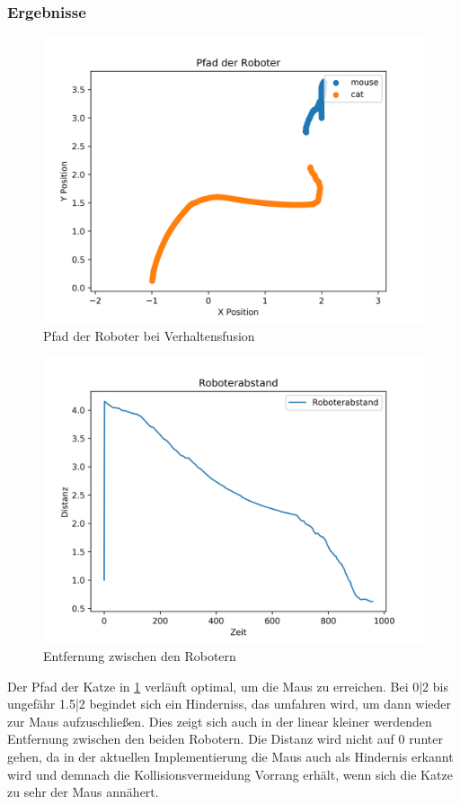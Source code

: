 \documentclass[12pt, a4paper]{report}
\begin{document}
\subsubsection{Ergebnisse}
\begin{figure}[]
    \centering
    \includegraphics[width=\textwidth]{report_pfad.png}
    \caption{Pfad der Roboter bei Verhaltensfusion}
    \label{fig:pfadFusion}
\end{figure}
\begin{figure}[]
    \centering
    \includegraphics[width=\textwidth]{report_distance.png}
    \caption{Entfernung zwischen den Robotern}
    \label{fig:distanceFusion}
\end{figure}
Der Pfad der Katze in \ref{fig:pfadFusion} verläuft optimal, um die Maus zu erreichen. Bei 0|2 bis ungefähr 1.5|2 begindet sich ein Hinderniss, das umfahren wird, um dann wieder zur Maus aufzuschließen. Dies zeigt sich auch in der linear kleiner werdenden Entfernung zwischen den beiden Robotern. Die Distanz wird nicht auf 0 runter gehen, da in der aktuellen Implementierung die Maus auch als Hindernis erkannt wird und demnach die Kollisionsvermeidung Vorrang erhält, wenn sich die Katze zu sehr der Maus annähert.
\end{document}
